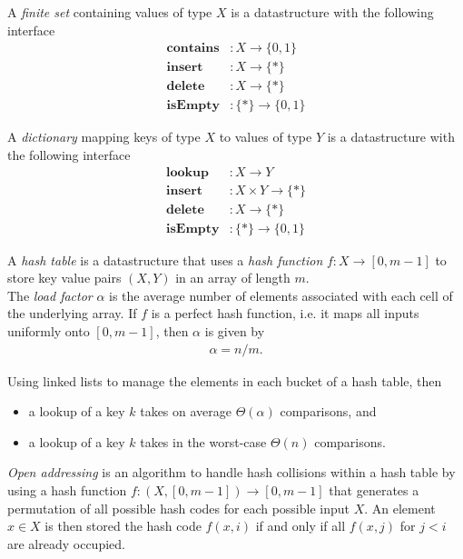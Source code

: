 \documentclass{article}
\begin{document}
\begin{definition}
	A \emph{finite set} containing values of type $X$ is a datastructure with the following interface
	\begin{align*}
		\textbf{contains} & : X\to \{0,1\}      \\
		\textbf{insert}   & : X \to \{*\}       \\
		\textbf{delete}   & : X \to \{*\}       \\
		\textbf{isEmpty}  & : \{*\} \to \{0,1\}
	\end{align*}
\end{definition}
\begin{definition}
	A \emph{dictionary} mapping keys of type $X$ to values of type $Y$
	is a datastructure with the following interface
	\begin{align*}
		\textbf{lookup}  & : X \to Y              \\
		\textbf{insert}  & : X \times Y \to \{*\} \\
		\textbf{delete}  & : X \to \{*\}          \\
		\textbf{isEmpty} & : \{*\} \to \{0,1\}
	\end{align*}
\end{definition}
\begin{definition}
	A \emph{hash table} is a datastructure that uses a \emph{hash function} $f: X \to [0,m-1]$
	to store key value pairs $(X,Y)$ in an array of length $m$.\\
	The \emph{load factor} $\alpha$ is the average number of elements associated with each cell
	of the underlying array. If $f$ is a perfect hash function, i.e. it maps all inputs uniformly
	onto $[0,m-1]$, then $\alpha$ is given by
	\begin{align*}
		\alpha = n / m.
	\end{align*}
\end{definition}
\begin{proposition}
	Using linked lists to manage the elements in each bucket of a hash table, then
	\begin{itemize}
		\item a lookup of a key $k$  takes on average $\Theta(\alpha)$ comparisons, and
		\item a lookup of a key $k$ takes in the worst-case $\Theta(n)$ comparisons.
	\end{itemize}
\end{proposition}
\begin{definition}
	\emph{Open addressing} is an algorithm to handle hash collisions within a hash table
	by using a hash function $f: (X, [0,m-1]) \to [0,m-1]$ that generates a permutation of all possible
	hash codes for each possible input $X$. An element $x\in X$ is then stored the hash code $f(x, i)$
	if and only if all $f(x,j)$ for $j < i$ are already occupied.
\end{definition}
\end{document}
